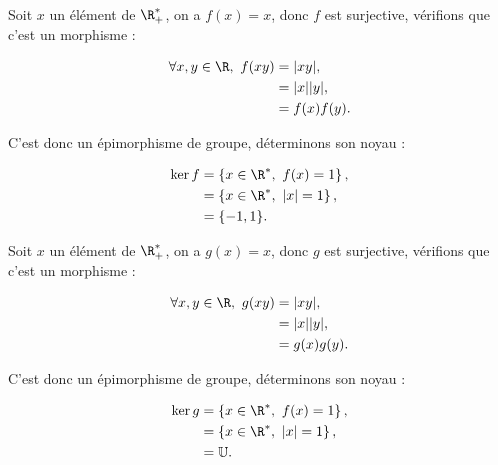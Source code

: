 Soit $x$ un élément de $\R^*_+$, on a $f(x)=x$, donc $f$ est surjective, vérifions que c'est un morphisme :

\begin{align*}
    \forall x,y \in \R,\ f(xy) &= |xy|, \\
    &= |x||y|, \\
    &= f(x)f(y).
\end{align*}

C'est donc un épimorphisme de groupe, déterminons son noyau :

\begin{align*}
    \ker f &= \left\{ x\in \R^*,\ f(x) = 1 \right\}, \\
           &= \left\{ x\in \R^*,\ |x| = 1 \right\}, \\
           &= \{-1, 1\}.
\end{align*}



Soit $x$ un élément de $\R^*_+$, on a $g(x)=x$, donc $g$ est surjective, vérifions que c'est un morphisme :

\begin{align*}
    \forall x,y \in \R,\ g(xy) &= |xy|, \\
    &= |x||y|, \\
    &= g(x)g(y).
\end{align*}

C'est donc un épimorphisme de groupe, déterminons son noyau :

\begin{align*}
    \ker g &= \left\{ x\in \R^*,\ f(x) = 1 \right\}, \\
           &= \left\{ x\in \R^*,\ |x| = 1 \right\}, \\
           &= \mathbb{U}.
\end{align*}